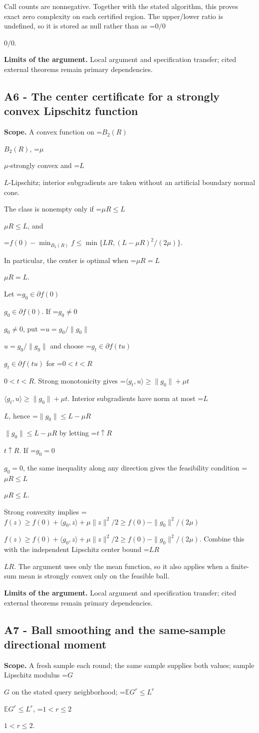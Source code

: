 \documentclass[10pt,a4paper]{article}
\newcommand{\AtlasMath}[1]{\par\begingroup\centering\setbox0=\hbox{$\displaystyle #1$}\ifdim\wd0>1.4\linewidth\typeout{ATLAS WIDE FORMULA: \the\wd0}\fi\ifdim\wd0>\linewidth\resizebox{\linewidth}{!}{\box0}\else\box0\fi\par\endgroup}
\newcommand{\AtlasInlineMath}[1]{\begingroup\setbox0=\hbox{$#1$}\ifdim\wd0>.4\linewidth\endgroup\AtlasMath{#1}\else\endgroup$#1$\fi}
\begin{document}
Call counts are nonnegative. Together with the stated algorithm, this proves exact zero complexity on each certified region. The upper/lower ratio is undefined, so it is stored as null rather than as \AtlasInlineMath{0/0}.

\textbf{Limits of the argument.} Local argument and specification transfer; cited external theorems remain primary dependencies.

\subsection{A6 - The center certificate for a strongly convex Lipschitz function}
\textbf{Scope.} A convex function on \AtlasInlineMath{B_2(R)}, \AtlasInlineMath{\mu}-strongly convex and \AtlasInlineMath{L}-Lipschitz; interior subgradients are taken without an artificial boundary normal cone.

The class is nonempty only if \AtlasInlineMath{\mu R\le L}, and

\AtlasMath{f(0)-\min_{B_2(R)} f\le\min\{LR,(L-\mu R)^2/(2\mu)\}.}

In particular, the center is optimal when \AtlasInlineMath{\mu R=L}.

Let \AtlasInlineMath{g_0\in\partial f(0)}. If \AtlasInlineMath{g_0\ne0}, put \AtlasInlineMath{u=g_0/\|g_0\|} and choose \AtlasInlineMath{g_t\in\partial f(tu)} for \AtlasInlineMath{0<t<R}. Strong monotonicity gives \AtlasInlineMath{\langle g_t,u\rangle\ge\|g_0\|+\mu t}. Interior subgradients have norm at most \AtlasInlineMath{L}, hence \AtlasInlineMath{\|g_0\|\le L-\mu R} by letting \AtlasInlineMath{t\uparrow R}. If \AtlasInlineMath{g_0=0}, the same inequality along any direction gives the feasibility condition \AtlasInlineMath{\mu R\le L}.

Strong convexity implies \AtlasInlineMath{f(z)\ge f(0)+\langle g_0,z\rangle+\mu\|z\|^2/2\ge f(0)-\|g_0\|^2/(2\mu)}. Combine this with the independent Lipschitz center bound \AtlasInlineMath{LR}. The argument uses only the mean function, so it also applies when a finite-sum mean is strongly convex only on the feasible ball.

\textbf{Limits of the argument.} Local argument and specification transfer; cited external theorems remain primary dependencies.

\subsection{A7 - Ball smoothing and the same-sample directional moment}
\textbf{Scope.} A fresh sample each round; the same sample supplies both values; sample Lipschitz modulus \AtlasInlineMath{G} on the stated query neighborhood; \AtlasInlineMath{\mathbb E G^r\le L^r}, \AtlasInlineMath{1<r\le2}.
\end{document}
